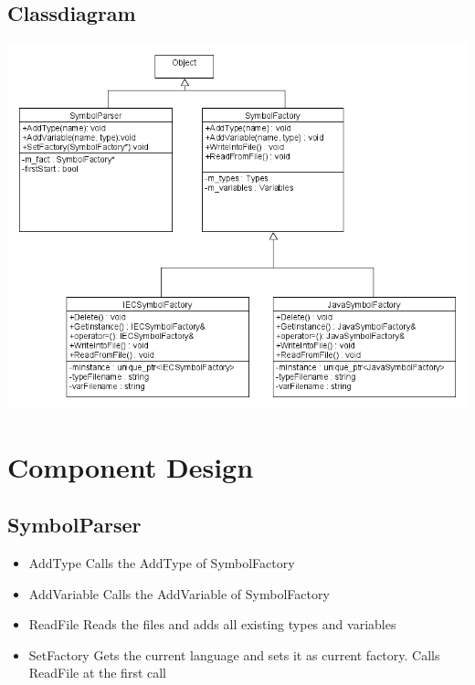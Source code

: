 \subsection{Classdiagram}
\includegraphics[scale=0.56, angle=90]{ClassDiagramm}

	
\section{Component Design}
\subsection{SymbolParser}
\begin{itemize}
	\item AddType
	\subitem Calls the AddType of SymbolFactory
	\item AddVariable
	\subitem Calls the AddVariable of SymbolFactory
	\item ReadFile
	\subitem Reads the files and adds all existing types and variables
	\item SetFactory
	 \subitem Gets the current language and sets it as current factory. Calls ReadFile at the first call
\end{itemize}



